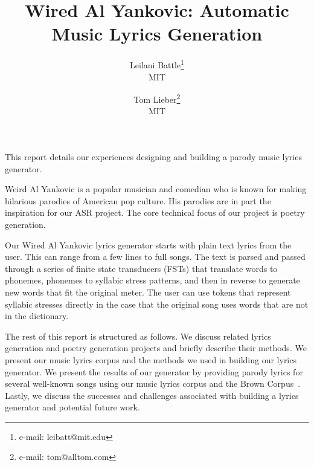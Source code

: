 \documentclass{vgtc}                          %
\title{Wired Al Yankovic: Automatic Music Lyrics Generation}
\author{Leilani Battle\thanks{e-mail: leibatt@mit.edu}\\ %
        \scriptsize MIT %
\and Tom Lieber\thanks{e-mail: tom@alltom.com}\\ %
     \scriptsize MIT}
\begin{document}


\maketitle

\label{sec:intro}
This report details our experiences designing and building a parody music lyrics generator.

Weird Al Yankovic is a popular musician and comedian who is known for making
hilarious parodies of American pop culture. His parodies are in part the inspiration for our ASR
project. The core technical focus of our project is poetry generation.

Our Wired Al Yankovic lyrics generator starts with plain text lyrics from the user. This
can range from a few lines to full songs. The text is parsed and passed
through a series of finite state transducers (FSTs) that translate words to phonemes, phonemes to syllabic stress patterns, and then
in reverse to generate new words that fit the original meter. The user can use tokens that represent
syllabic stresses directly in the case that the original song uses words that are not in the dictionary.

The rest of this report is structured as follows. We discuss related lyrics generation
and poetry generation projects and briefly describe their methods. We present
our music lyrics corpus and the methods we used in building our lyrics generator.
We present the results of our generator by providing parody lyrics for
several well-known songs using our music lyrics corpus
and the Brown Corpus~\cite{browncorpus}.
Lastly, we discuss the successes
and challenges associated with building a lyrics generator and potential
future work.
\end{document}
